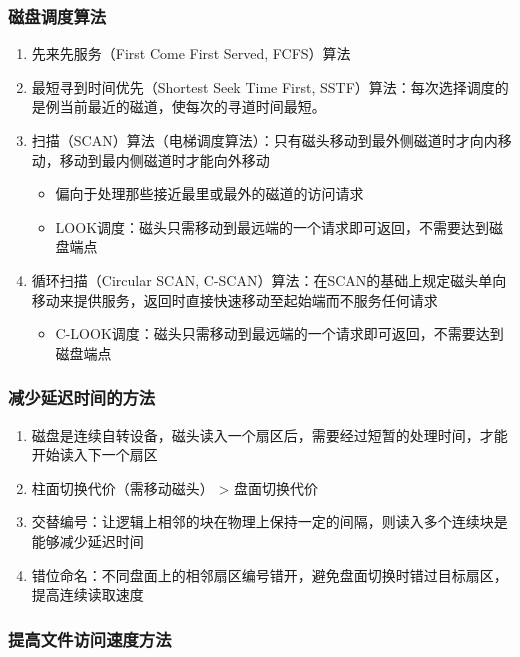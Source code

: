 \documentclass[./computer-organization-and-architecture.tex]{subfiles}
\begin{document}
    \subsubsection{磁盘调度算法}

    \begin{enumerate}
        \item 先来先服务（First Come First Served, FCFS）算法
        \item 最短寻到时间优先（Shortest Seek Time First, SSTF）算法：每次选择调度的是例当前最近的磁道，使每次的寻道时间最短。{\color{red}{会产生“饥饿”现象}}
        \item 扫描（SCAN）算法（电梯调度算法）：只有磁头移动到最外侧磁道时才向内移动，移动到最内侧磁道时才能向外移动
        \begin{itemize}
            \item 偏向于处理那些接近最里或最外的磁道的访问请求
            \item LOOK调度：磁头只需移动到最远端的一个请求即可返回，不需要达到磁盘端点
        \end{itemize}
        \item 循环扫描（Circular SCAN, C-SCAN）算法：在SCAN的基础上规定磁头单向移动来提供服务，返回时直接快速移动至起始端而不服务任何请求
        \begin{itemize}
            \item C-LOOK调度：磁头只需移动到最远端的一个请求即可返回，不需要达到磁盘端点
        \end{itemize}
    \end{enumerate}

    \subsubsection{减少延迟时间的方法}

    \begin{enumerate}
        \item 磁盘是连续自转设备，磁头读入一个扇区后，需要经过短暂的处理时间，才能开始读入下一个扇区
        \item 柱面切换代价（需移动磁头） > 盘面切换代价
        \item 交替编号：让逻辑上相邻的块在物理上保持一定的间隔，则读入多个连续块是能够减少延迟时间
        \item 错位命名：不同盘面上的相邻扇区编号错开，避免盘面切换时错过目标扇区，提高连续读取速度
    \end{enumerate}

    \subsubsection{提高文件访问速度方法}
\end{document}

